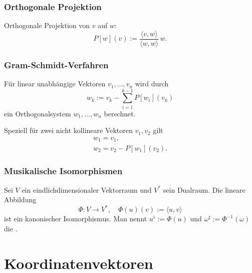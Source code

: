 \subsubsection{Orthogonale Projektion}
Orthogonale Projektion von $v$ auf $w$:
\begin{equation}
P[w](v) := \frac{\langle v,w\rangle}{\langle w,w\rangle}\,w.
\end{equation}
\subsubsection{Gram-Schmidt-Verfahren}
Für linear unabhängige Vektoren $v_1,\ldots,v_n$
wird durch%
\begin{equation}
w_k := v_k - \sum_{i=1}^{k-1} P[w_i](v_k)
\end{equation}
ein Orthogonalsystem $w_1,\ldots,w_n$ berechnet.

Speziell für zwei nicht kollineare Vektoren $v_1,v_2$ gilt
\begin{gather}
w_1=v_1,\\
w_2=v_2-P[w_1](v_2).
\end{gather}

\newpage
\subsubsection{Musikalische Isomorphismen}
\begin{definition}%
Sei $V$ ein eindlichdimensionaler Vektorraum und
$V^*$ sein Dualraum. Die lineare Abbildung
\begin{equation}
\Phi\colon V\to V^*,\quad \Phi(u)(v):=\langle u,v\rangle
\end{equation}
ist ein kanonischer Isomorphismus.%
Man nennt $u^\flat:=\Phi(u)$
und $\omega^\sharp:=\Phi^{-1}(\omega)$ die .
\end{definition}

\section{Koordinatenvektoren}
